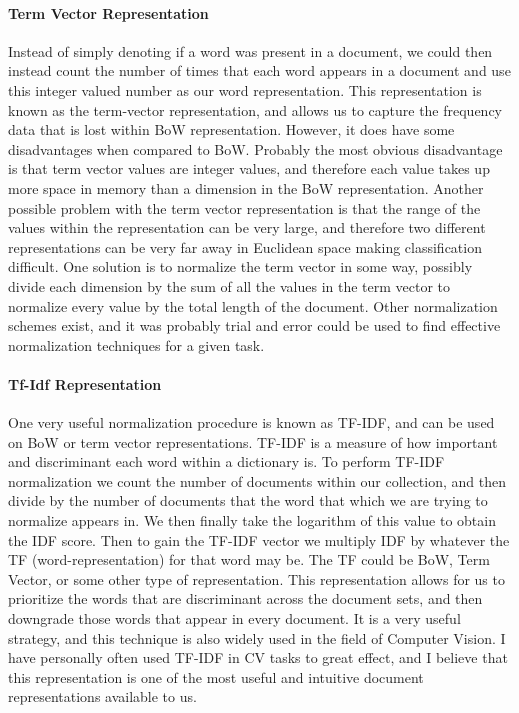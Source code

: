 \documentclass[paper=a4, fontsize=11pt]{scrartcl} %
\begin{document}
\paragraph{Term Vector Representation}
Instead of simply denoting if a word was present in a document, we could then instead count the number of times that each word appears in a document and use this integer valued number as our word representation.  
This representation is known as the term-vector representation, and allows us to capture the frequency data that is lost within BoW representation.  
However, it does have some disadvantages when compared to BoW.  
Probably the most obvious disadvantage is that term vector values are integer values, and therefore each value takes up more space in memory than a dimension in the BoW representation.  
Another possible problem with the term vector representation is that the range of the values within the representation can be very large, and therefore two different representations can be very far away in Euclidean space making classification difficult.  
One solution is to normalize the term vector in some way, possibly divide each dimension by the sum of all the values in the term vector to normalize every value by the total length of the document.  
Other normalization schemes exist, and it was probably trial and error could be used to find effective normalization techniques for a given task.

\paragraph{Tf-Idf Representation}
One very useful normalization procedure is known as TF-IDF, and can be used on BoW or term vector representations.  
TF-IDF is a measure of how important and discriminant each word within a dictionary is.  
To perform TF-IDF normalization we count the number of documents within our collection, and then divide by the number of documents that the word that which we are trying to normalize appears in.  
We then finally take the logarithm of this value to obtain the IDF score.  
Then to gain the TF-IDF vector we multiply IDF by whatever the TF (word-representation) for that word may be.  
The TF could be BoW, Term Vector, or some other type of representation.  
This representation allows for us to prioritize the words that are discriminant across the document sets, and then downgrade those words that appear in every document.  
It is a very useful strategy, and this technique is also widely used in the field of Computer Vision.  I have personally often used TF-IDF in CV tasks to great effect, and I believe that this representation is one of the most useful and intuitive document representations available to us.
\end{document}
